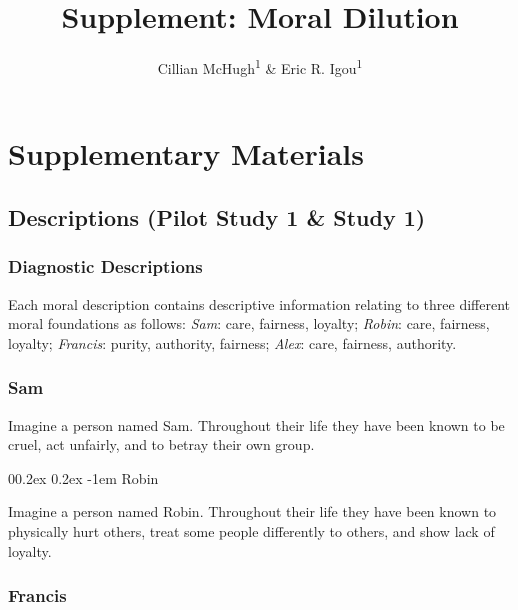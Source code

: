 \documentclass[
  american,
  man,mask,floatsintext]{apa6}
\title{Supplement: Moral Dilution}
\author{Cillian McHugh\textsuperscript{1} \& Eric R. Igou\textsuperscript{1}}
\date{}
\affiliation{\vspace{0.5cm}\textsuperscript{1} University of Limerick}
\makeatletter
\let\oldparagraph\paragraph
\renewcommand{\paragraph}[1]{\oldparagraph{#1}\mbox{}}
\renewcommand{\paragraph}{\@startsection{paragraph}{4}{\parindent}%
  {0\baselineskip \@plus 0.2ex \@minus 0.2ex}%
  {-1em}%
  {\normalfont\normalsize\bfseries\itshape\typesectitle}}
\makeatother
\begin{document}
\maketitle

\hypertarget{supplementary-materials}{%
\section{Supplementary Materials}\label{supplementary-materials}}

\hypertarget{descriptions-pilot-study-1-study-1}{%
\subsection{Descriptions (Pilot Study 1 \& Study 1)}\label{descriptions-pilot-study-1-study-1}}

\hypertarget{diagnostic-descriptions}{%
\subsubsection{Diagnostic Descriptions}\label{diagnostic-descriptions}}

Each moral description contains descriptive information relating to three different moral foundations as follows: \emph{Sam}: care, fairness, loyalty; \emph{Robin}: care, fairness, loyalty; \emph{Francis}: purity, authority, fairness; \emph{Alex}: care, fairness, authority.

\hypertarget{sam}{%
\subsubsection{Sam}\label{sam}}

Imagine a person named Sam.
Throughout their life they have been known to be cruel, act unfairly, and to betray their own group.

\hypertarget{robin}{%
\paragraph{Robin}\label{robin}}

Imagine a person named Robin.
Throughout their life they have been known to physically hurt others, treat some people differently to others, and show lack of loyalty.

\hypertarget{francis}{%
\subsubsection{Francis}\label{francis}}
\end{document}
